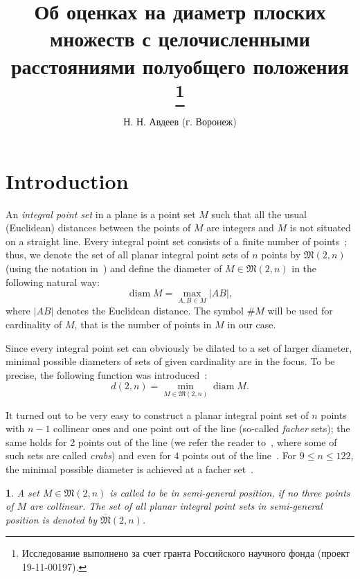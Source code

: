 \documentclass[11pt,twoside,draft
]{article}
\title
{%
Об оценках на диаметр плоских множеств с целочисленными расстояниями полуобщего положения%
\footnote{Исследование выполнено за счет гранта Российского научного фонда (проект 19-11-00197).}}
{%
On diameter bounds for planar integral point sets in semi-general position}
\author
{%
Н. Н. Авдеев (г. Воронеж)}
{%
N. N. Avdeev (Voronezh)}
\newtheorem{Definition}{\indent {\sc Definition}}
\renewcommand*{\&}{\textbackslash \symbol{38}}%
\begin{document}
\maketitle

\enmaketitle



\section{Introduction}



An \textit{integral point set} in a plane is a point set $M$ such that all the usual (Euclidean) distances between the
points of $M$ are integers and $M$ is not situated on a straight line.
Every integral point set consists of a finite number of points~\cite{anning1945integral,erdos1945integral};
thus, we denote the set of all planar integral point sets of $n$ points by
$\mathfrak{M}(2,n)$ (using the notation in~\cite{our-vmmsh-2018})
and define the diameter of $M\in\mathfrak{M}(2,n)$ in the following natural way:
\begin{equation}
	\operatorname{diam} M = \max_{A,B\in M} |AB|
	,
\end{equation}
where $|AB|$ denotes the Euclidean distance.
The symbol $\# M$ will be used for cardinality of $M$, that is the number of points in $M$ in our case.

Since every integral point set can obviously be dilated to a set of larger diameter,
minimal possible diameters of sets of given cardinality are in the focus.
To be precise,
the following function was introduced~\cite{kurz2008bounds,kurz2008minimum}:
\begin{equation}
	d(2,n) = \min_{M\in\mathfrak{M}(2,n)} \operatorname{diam} M
	.
\end{equation}

It turned out to be very easy to construct a planar integral point set of $n$ points with $n-1$ collinear ones and one point out of the line
(so-called \textit{facher} sets);
the same holds for 2 points out of the line (we refer the reader to~\cite{antonov2008maximal}, where some of such sets are called \textit{crabs})
and even for 4 points out of the line~\cite{huff1948diophantine}.
For $9\leq n\leq 122$, the minimal possible diameter is achieved at a facher set~\cite{kurz2008bounds}.


\begin{Definition}
	A set $M\in\mathfrak{M}(2,n)$ is called to be in \textit{semi-general position},
	if no three points of $M$ are collinear.
	The set of all planar integral point sets in semi-general position
	is denoted by $\overline{\mathfrak{M}}(2,n)$.
\end{Definition}
\end{document}
